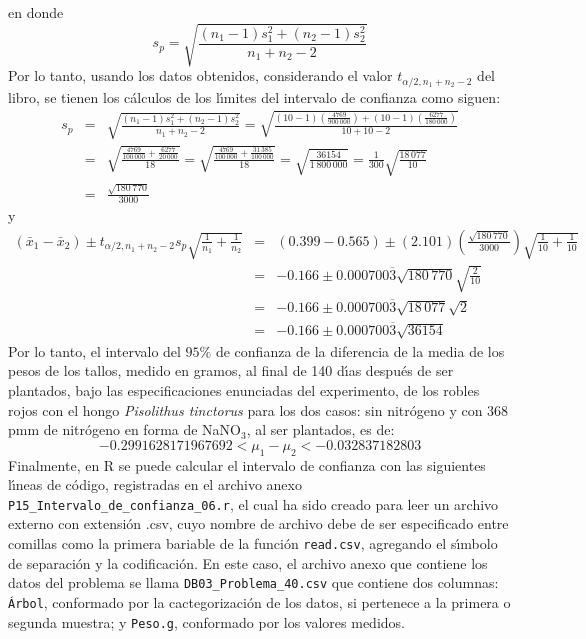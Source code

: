 \begin{solucion}
\begin{equation*}
 \end{equation*}
 en donde
 \begin{equation*}
  s_p = \sqrt{\frac{\left( n_1-1 \right)s_1^2 + \left( n_2 - 1 \right)s_2^2}{n_1 + n_2 - 2}}
 \end{equation*}
 Por lo tanto, usando los datos obtenidos, considerando el valor $t_{\alpha/2,n_1+n_2-2}$ del libro, se tienen los c\'alculos de los l\'{\i}mites del intervalo de confianza como siguen:
 \begin{eqnarray*}
  s_p & = & \sqrt{\frac{\left( n_1-1 \right)s_1^2 + \left( n_2 - 1 \right)s_2^2}{n_1 + n_2 - 2}} = \sqrt{\frac{(10-1)\left(\frac{4769}{900\,000}\right) + (10-1)\left(\frac{6277}{180\,000}\right)}{10+10-2}} \\
  & = & \sqrt{\frac{\frac{4769}{100\,000} + \frac{6277}{20\,000}}{18}} = \sqrt{\frac{\frac{4769}{100\,000} + \frac{31\,385}{100\,000}}{18}} = \sqrt{\frac{36154}{1\,800\,000}} = \frac{1}{300}\sqrt{\frac{18\,077}{10}} \\
  & = & \frac{\sqrt{180\,770}}{3000}
 \end{eqnarray*}
 y
 \begin{eqnarray*}
  \left( \bar{x}_1 - \bar{x}_2  \right) \pm t_{\alpha/2,n_1+n_2-2}s_p \sqrt{\frac{1}{n_1} + \frac{1}{n_2}} 
  & = & (0.399 - 0.565) \pm (2.101)\left(\frac{\sqrt{180\,770}}{3000} \right) \sqrt{\frac{1}{10} + \frac{1}{10}} \\
  & = & -0.166 \pm 0.000700\overline{3}\sqrt{180\,770}\sqrt{\frac{2}{10}} \\
  & = & -0.166 \pm 0.000700\overline{3}\sqrt{18\,077}\sqrt{2} \\
  & = & -0.166 \pm 0.000700\overline{3}\sqrt{36154}
 \end{eqnarray*}
 Por lo tanto, el intervalo del $95\%$ de confianza de la diferencia de la media de los pesos de los tallos, medido en gramos, al final de 140 d\'{\i}as despu\'es de ser plantados, bajo las especificaciones enunciadas del experimento, de los robles rojos con el hongo \textit{Pisolithus tinctorus} para los dos casos: sin nitr\'ogeno  y con 368 pmm de nitr\'ogeno en forma de NaNO${}_3$, al ser plantados, es de:
 \begin{equation*}
  -0.2991628171967692 < \mu_1 - \mu_2 < -0.032837182803
 \end{equation*}
 Finalmente, en R se puede calcular el intervalo de confianza con las siguientes l\'{\i}neas de c\'odigo, registradas en el archivo anexo \texttt{P15\_Intervalo\_de\_confianza\_06.r}, el cual ha sido creado para leer un archivo externo con extensi\'on .csv, cuyo nombre de archivo debe de ser especificado entre comillas como la primera bariable de la funci\'on \texttt{read.csv}, agregando el s\'{\i}mbolo de separaci\'on y la codificaci\'on. En este caso, el archivo anexo que contiene los datos del problema se llama \texttt{DB03\_Problema\_40.csv}  que contiene dos columnas: \texttt{\'Arbol}, conformado por la cactegorizaci\'on de los datos, si pertenece a la primera o segunda muestra; y \texttt{Peso.g}, conformado por los valores medidos.

\end{solucion}
